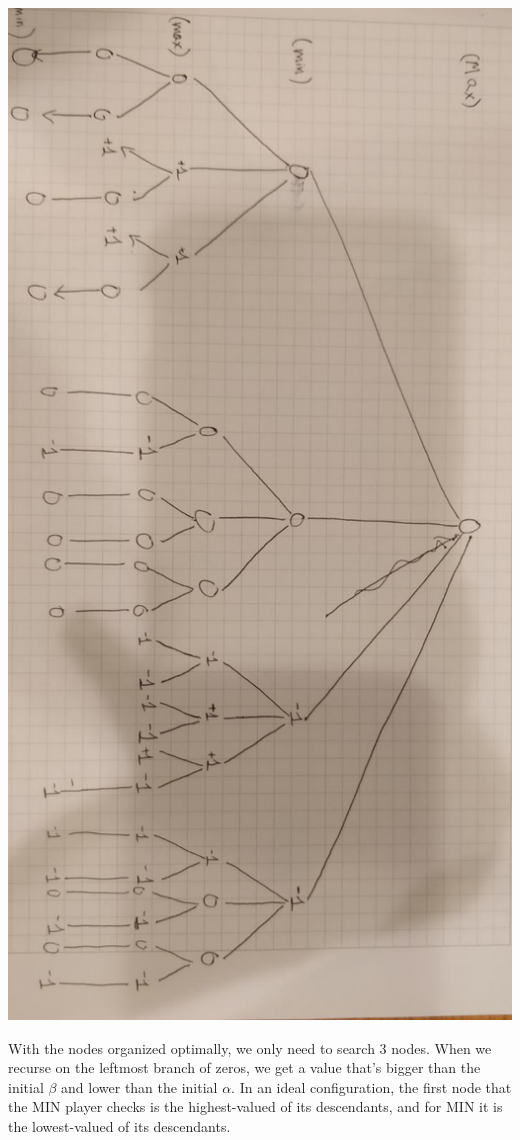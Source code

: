 \documentclass{article}
\begin{document}
		\begin{center}
		\includegraphics[scale=0.2,angle=90]{alpha-beta}
		\end{center}

		With the nodes organized optimally, we only need to search 3 nodes. When we recurse on the 
		leftmost branch of zeros, we get a value that's bigger than the initial $\beta$ and lower than 
		the initial $\alpha$. In an ideal configuration, the first node that the MIN player checks
		is the highest-valued of its descendants, and for MIN it is the lowest-valued of its descendants.
\end{document}
